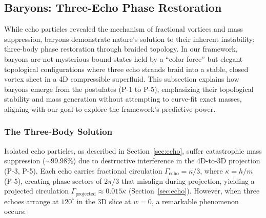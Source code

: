 
\subsection{Baryons: Three-Echo Phase Restoration}
\label{sec:baryons}

While echo particles revealed the mechanism of fractional vortices and mass suppression, baryons demonstrate nature's solution to their inherent instability: three-body phase restoration through braided topology. In our framework, baryons are not mysterious bound states held by a ``color force'' but elegant topological configurations where three echo strands braid into a stable, closed vortex sheet in a 4D compressible superfluid. This subsection explains how baryons emerge from the postulates (P-1 to P-5), emphasizing their topological stability and mass generation without attempting to curve-fit exact masses, aligning with our goal to explore the framework's predictive power.

\subsubsection{The Three-Body Solution}

Isolated echo particles, as described in Section~\ref{sec:echo}, suffer catastrophic mass suppression ($\sim 99.98\%$) due to destructive interference in the 4D-to-3D projection (P-3, P-5). Each echo carries fractional circulation $\Gamma_{\text{echo}} = \kappa/3$, where $\kappa = h/m$ (P-5), creating phase sectors of $2\pi/3$ that misalign during projection, yielding a projected circulation $\Gamma_{\text{projected}} \approx 0.015 \kappa$ (Section~\ref{sec:echo}). However, when three echoes arrange at $120^\circ$ in the 3D slice at $w=0$, a remarkable phenomenon occurs:

